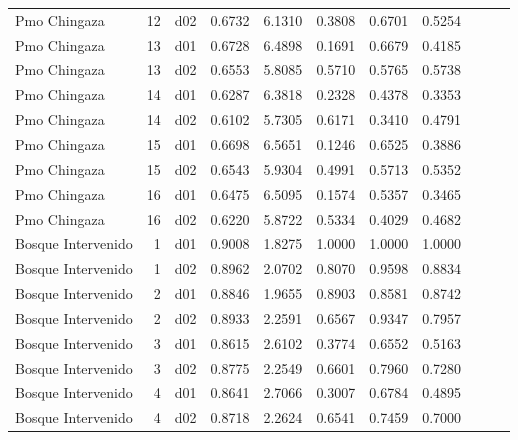 \begin{landscape}
\begin{longtable}{p{2cm}rrrrrrrrrr}
            Pmo Chingaza  &         12 &     d02 &   0.6732 &  6.1310 &        0.3808 &           0.6701 &  0.5254 \\
            Pmo Chingaza  &         13 &     d01 &   0.6728 &  6.4898 &        0.1691 &           0.6679 &  0.4185 \\
            Pmo Chingaza  &         13 &     d02 &   0.6553 &  5.8085 &        0.5710 &           0.5765 &  0.5738 \\
            Pmo Chingaza  &         14 &     d01 &   0.6287 &  6.3818 &        0.2328 &           0.4378 &  0.3353 \\
            Pmo Chingaza  &         14 &     d02 &   0.6102 &  5.7305 &        0.6171 &           0.3410 &  0.4791 \\
            Pmo Chingaza  &         15 &     d01 &   0.6698 &  6.5651 &        0.1246 &           0.6525 &  0.3886 \\
            Pmo Chingaza  &         15 &     d02 &   0.6543 &  5.9304 &        0.4991 &           0.5713 &  0.5352 \\
            Pmo Chingaza  &         16 &     d01 &   0.6475 &  6.5095 &        0.1574 &           0.5357 &  0.3465 \\
            Pmo Chingaza  &         16 &     d02 &   0.6220 &  5.8722 &        0.5334 &           0.4029 &  0.4682 \\
    Bosque Intervenido    &          1 &     d01 &   0.9008 &  1.8275 &        1.0000 &           1.0000 &  1.0000 \\
    Bosque Intervenido    &          1 &     d02 &   0.8962 &  2.0702 &        0.8070 &           0.9598 &  0.8834 \\
    Bosque Intervenido    &          2 &     d01 &   0.8846 &  1.9655 &        0.8903 &           0.8581 &  0.8742 \\
    Bosque Intervenido    &          2 &     d02 &   0.8933 &  2.2591 &        0.6567 &           0.9347 &  0.7957 \\
    Bosque Intervenido    &          3 &     d01 &   0.8615 &  2.6102 &        0.3774 &           0.6552 &  0.5163 \\
    Bosque Intervenido    &          3 &     d02 &   0.8775 &  2.2549 &        0.6601 &           0.7960 &  0.7280 \\
    Bosque Intervenido    &          4 &     d01 &   0.8641 &  2.7066 &        0.3007 &           0.6784 &  0.4895 \\
    Bosque Intervenido    &          4 &     d02 &   0.8718 &  2.2624 &        0.6541 &           0.7459 &  0.7000 \\

\end{longtable}
\end{landscape}
